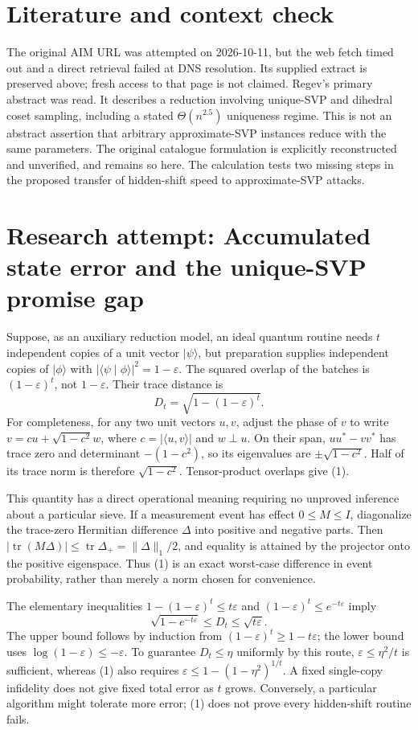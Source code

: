 \documentclass[11pt]{article}
\begin{document}
\section{Literature and context check}
The original AIM URL was attempted on 2026-10-11, but the web fetch timed out and a direct retrieval failed at DNS resolution. Its supplied extract is preserved above; fresh access to that page is not claimed. Regev's primary abstract was read. It describes a reduction involving unique-SVP and dihedral coset sampling, including a stated $\Theta(n^{2.5})$ uniqueness regime. This is not an abstract assertion that arbitrary approximate-SVP instances reduce with the same parameters. The original catalogue formulation is explicitly reconstructed and unverified, and remains so here. The calculation tests two missing steps in the proposed transfer of hidden-shift speed to approximate-SVP attacks.
\section{Research attempt: Accumulated state error and the unique-SVP promise gap}
Suppose, as an auxiliary reduction model, an ideal quantum routine needs $t$ independent copies of a unit vector $|\psi\rangle$, but preparation supplies independent copies of $|\phi\rangle$ with
$|\langle\psi\mid\phi\rangle|^2=1-\varepsilon$. The squared overlap of the batches is $(1-\varepsilon)^t$, not $1-\varepsilon$. Their trace distance is
\[
 D_t=\sqrt{1-(1-\varepsilon)^t}.                 \tag{1}
\]
For completeness, for any two unit vectors $u,v$, adjust the phase of $v$ to write $v=cu+\sqrt{1-c^2}w$, where $c=|\langle u,v\rangle|$ and $w\perp u$. On their span, $uu^*-vv^*$ has trace zero and determinant $-(1-c^2)$, so its eigenvalues are $\pm\sqrt{1-c^2}$. Half of its trace norm is therefore $\sqrt{1-c^2}$. Tensor-product overlaps give (1).

This quantity has a direct operational meaning requiring no unproved inference about a particular sieve. If a measurement event has effect $0\leq M\leq I$, diagonalize the trace-zero Hermitian difference $\Delta$ into positive and negative parts. Then $|\operatorname{tr}(M\Delta)|\leq\operatorname{tr}\Delta_+=\|\Delta\|_1/2$, and equality is attained by the projector onto the positive eigenspace. Thus (1) is an exact worst-case difference in event probability, rather than merely a norm chosen for convenience.

The elementary inequalities $1-(1-\varepsilon)^t\leq t\varepsilon$ and $(1-\varepsilon)^t\leq e^{-t\varepsilon}$ imply
\[
 \sqrt{1-e^{-t\varepsilon}}\leq D_t\leq\sqrt{t\varepsilon}.
\]
The upper bound follows by induction from $(1-\varepsilon)^t\geq1-t\varepsilon$; the lower bound uses $\log(1-\varepsilon)\leq-\varepsilon$. To guarantee $D_t\leq\eta$ uniformly by this route, $\varepsilon\leq\eta^2/t$ is sufficient, whereas (1) also requires $\varepsilon\leq1-(1-\eta^2)^{1/t}$. A fixed single-copy infidelity does not give fixed total error as $t$ grows. Conversely, a particular algorithm might tolerate more error; (1) does not prove every hidden-shift routine fails.
\end{document}

